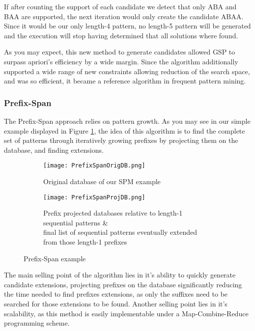 \documentclass{eplmastersthesis}
\begin{document}
If after counting the support of each candidate we detect that only ABA and BAA are supported, the next iteration would only create the candidate ABAA. Since it would be our only length-4 pattern, no length-5 pattern will be generated and the execution will stop having determined that all solutions where found. \newline

As you may expect, this new method to generate candidates allowed GSP to surpass apriori's efficiency by a wide margin. Since the algorithm additionally supported a wide range of new constraints allowing reduction of the search space, and was so efficient, it became a reference algorithm in frequent pattern mining.

\subsubsection{Prefix-Span}

The Prefix-Span approach \cite{pei2004mining, han2001prefixspan} relies on pattern growth. As you may see in our simple example displayed in Figure \ref{ex:PrefixSpanExample}, the idea of this algorithm is to find the complete set of patterns through iteratively growing prefixes by projecting them on the database, and finding extensions. \newline

\begin{figure}[h]
  \centering
  \begin{subfigure}{\textwidth}
  	\centering
    \texttt{[image: PrefixSpanOrigDB.png]}
    \caption{Original database of our SPM example}
  \end{subfigure}
  \begin{subfigure}{\textwidth}
  	\centering
    \texttt{[image: PrefixSpanProjDB.png]}
    \caption[Prefix projected database \& sequential pattern]{
			Prefix projected databases relative to length-1 sequential patterns \& \\
			final list of sequential patterns eventually extended from those length-1 prefixes
		\endtabular
	}
  \end{subfigure}
  \caption{Prefix-Span example}
  \label{ex:PrefixSpanExample}
\end{figure}

The main selling point of the algorithm lies in it's ability to quickly generate candidate extensions, projecting prefixes on the database significantly reducing the time needed to find prefixes extensions, as only the suffixes need to be searched for those extensions to be found. Another selling point lies in it's scalability, as this method is easily implementable under a Map-Combine-Reduce programming scheme. \newline
\end{document}
